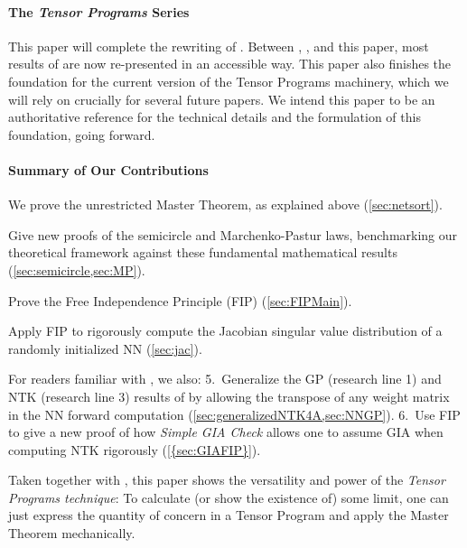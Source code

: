 \documentclass{article}
\theoremstyle{definition}
\theoremstyle{remark}
\begin{document}
\paragraph*{The \emph{Tensor Programs} Series}

This paper will complete the rewriting of \citet{yangScalingLimitsWide2019arXiv.org}. Between \citep{yangTP1}, \citep{yangTP2}, and this paper, most results of \citet{yangScalingLimitsWide2019arXiv.org} are now re-presented in an accessible way. This paper also finishes the foundation for the current version of the Tensor Programs machinery, which we will rely on crucially for several future papers. We intend this paper to be an authoritative reference for the technical details and the formulation of this foundation, going forward.

\paragraph*{Summary of Our Contributions}
\begin{enumerate*}
\item We prove the unrestricted Master Theorem, as explained above (\cref{sec:netsort}).
\item Give new proofs of the semicircle and Marchenko-Pastur laws, benchmarking our theoretical framework against these fundamental mathematical results (\cref{sec:semicircle,sec:MP}).
\item Prove the Free Independence Principle (FIP) (\cref{sec:FIPMain}).
\item Apply FIP to rigorously compute the Jacobian singular value distribution of a randomly initialized NN (\cref{sec:jac}).
\end{enumerate*}

For readers familiar with \citep{yangTP1,yangTP2}, we also: 5.\ Generalize the GP (research line 1) and NTK (research line 3) results of \citep{yangTP1,yangTP2} by allowing the transpose of any weight matrix in the NN forward computation (\cref{sec:generalizedNTK4A,sec:NNGP}).
6.\ Use FIP to give a new proof of how \emph{Simple GIA Check} allows one to assume GIA when computing NTK rigorously (\cref{{sec:GIAFIP}}).

Taken together with \citep{yangTP1,yangTP2}, this paper shows the versatility and power of the \emph{Tensor Programs technique}: To calculate (or show the existence of) some limit, one can just express the quantity of concern in a Tensor Program and apply the Master Theorem mechanically.
\end{document}
